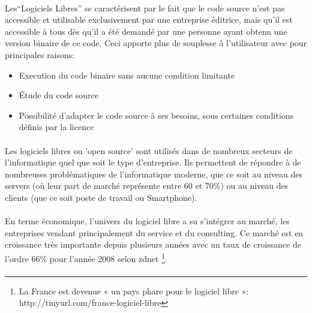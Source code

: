 \paragraph{} 

Les``Logiciels Libres'' se caractérisent par le fait
que le code source n'est pas accessible et utilisable exclusivement par
une entreprise éditrice, mais qu'il est accessible à tous dès qu'il a
été demandé par une personne ayant obtenu une version binaire de ce code.
Ceci apporte plus de souplesse à l'utilisateur avec pour principales raisons:

\begin{itemize}

  \item {Execution du code binaire sans aucune condition limitante}

  \item {Étude du code source}

  \item {Possibilité d'adapter le code source à ses besoins, sous
  certaines
    conditions définis par la licence}

\end{itemize}

\paragraph {}

Les logiciels libres ou 'open source' sont utilisés dans de nombreux
secteurs de l'informatique quel que soit le type d'entreprise. Ils
permettent de répondre à de nombreuses problématiques de l'informatique
moderne, que ce soit au niveau des servers (où leur part de marché
représente entre 60 et 70\%) ou au niveau des clients (que
ce soit poste de travail ou Smartphone).

\paragraph {}

En terme économique, l'univers du logiciel libre a su s'intégrer
au marché, les entreprises vendant principalement du service et du
consulting. Ce marché est en croissance très importante depuis plusieurs
années avec un taux de croissance de l'ordre 66\% pour l'année 2008
selon zdnet \footnote{La France est devenue « un pays phare pour le
logiciel libre »: http://tinyurl.com/france-logiciel-libre}.

\paragraph{}


